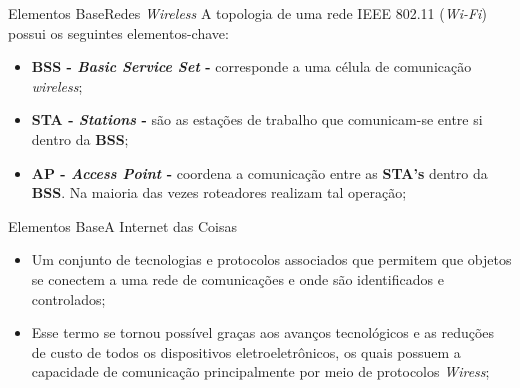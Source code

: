 \begin{frame}{Elementos Base}{Redes \textit{Wireless}}
    A topologia de uma rede IEEE 802.11 (\textit{Wi-Fi})  possui os seguintes elementos-chave:

    \begin{itemize}
        \item \textbf{BSS - \textit{Basic Service Set} -} corresponde a uma célula de comunicação \textit{wireless};
        \item \textbf{STA - \textit{Stations} -} são as estações de trabalho que comunicam-se entre si dentro da \textbf{BSS};
        \item \textbf{AP - \textit{Access Point} -} coordena a comunicação entre as \textbf{STA's} dentro da \textbf{BSS}. Na maioria das vezes roteadores realizam tal operação;
        
    \end{itemize}
    
\end{frame}


\begin{frame}{Elementos Base}{A Internet das Coisas}
    \begin{itemize}
        \item Um conjunto de tecnologias e protocolos associados que permitem que objetos se conectem a uma rede de comunicações e onde são identificados e controlados;
        \item Esse termo se tornou possível graças aos avanços tecnológicos e as reduções de custo de todos os dispositivos eletroeletrônicos, os quais possuem a capacidade de comunicação principalmente por meio de protocolos \textit{Wiress};
    \end{itemize}
    
\end{frame}

